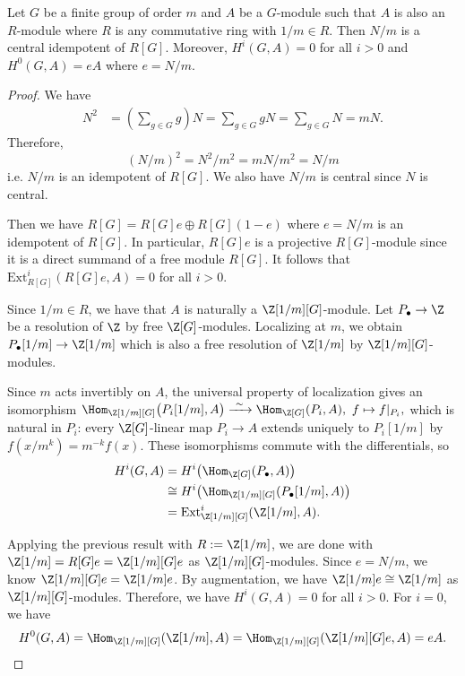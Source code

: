 \begin{theorem}
    Let $G$ be a finite group of order $m$ and $A$ be a $G$-module
    such that $A$ is also an $R$-module where $R$ is any commutative ring with $1/m \in R$.
    Then $N/m$ is a central idempotent of $R[G]$.
    Moreover, $H^i(G, A) = 0$ for all $i > 0$ and $H^0(G, A) = eA$ where $e = N/m$.
\end{theorem}
\begin{proof}
    We have 
    \begin{align*}
        N^2 &= \left(\sum_{g \in G} g\right)N = \sum_{g \in G} gN = \sum_{g \in G} N = mN.
    \end{align*}
    Therefore,
    \[
        (N/m)^2 = N^2/m^2 = mN/m^2 = N/m
    \]
    i.e. $N/m$ is an idempotent of $R[G]$.
    We also have $N/m$ is central since $N$ is central.

    Then we have $R[G] = R[G]e \oplus R[G](1-e)$ where $e = N/m$ is an idempotent of $R[G]$.
    In particular, $R[G]e$ is a projective $R[G]$-module since it is a direct summand of a free module $R[G]$.
    It follows that $\mathrm{Ext}^i_{R[G]}(R[G]e, A) = 0$ for all $i > 0$.

    Since $1/m \in R$, we have that $A$ is naturally a $\Z[1/m][G]$-module.
    Let $P_\bullet \to \Z$ be a resolution of $\Z$ by free $\Z[G]$-modules.
    Localizing at $m$, we obtain $P_\bullet[1/m] \to \Z[1/m]$
    which is also a free resolution of $\Z[1/m]$ by $\Z[1/m][G]$-modules.

    Since $m$ acts invertibly on $A$, the universal property of localization gives
    an isomorphism
    \(
        \Hom_{\Z[1/m][G]}\big(P_i[1/m], A\big) \xrightarrow{\ \sim\ } \Hom_{\Z[G]}(P_i, A),
        \ f \mapsto f|_{P_i},
    \)
    which is natural in $P_i$: every $\Z[G]$-linear map $P_i \to A$ extends uniquely to
    $P_i[1/m]$ by $f(x/m^k) = m^{-k}f(x)$. These isomorphisms commute with the
    differentials, so
    \begin{align*}
        H^i(G,A) &= H^i\big(\Hom_{\Z[G]}(P_\bullet, A)\big)\\
        &\cong H^i\big(\Hom_{\Z[1/m][G]}(P_\bullet[1/m], A)\big)\\
        &= \operatorname{Ext}^i_{\Z[1/m][G]}(\Z[1/m], A).
    \end{align*}

    Applying the previous result with $R := \Z[1/m]$, 
    we are done with $\Z[1/m] = R[G]e = \Z[1/m][G]e$ as $\Z[1/m][G]$-modules.
    Since $e = N/m$, we know $\Z[1/m][G]e = \Z[1/m]e$. By augmentation, we have $\Z[1/m]e \cong \Z[1/m]$ as $\Z[1/m][G]$-modules.
    Therefore, we have $H^i(G, A) = 0$ for all $i > 0$.
    For $i = 0$, we have 
    \begin{align*}
    H^0(G, A) = \Hom_{\Z[1/m][G]}(\Z[1/m], A) = \Hom_{\Z[1/m][G]}(\Z[1/m][G]e, A) = eA.
    \end{align*}
\end{proof}